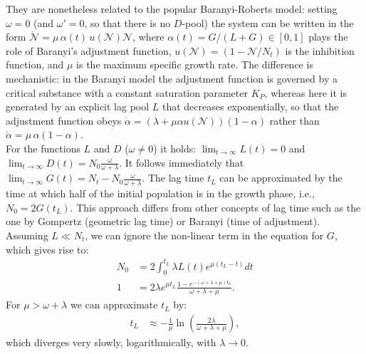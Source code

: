 \documentclass[10pt,1p,authoryear]{elsarticle}
\numberwithin{equation}{section}
\begin{document}
They are nonetheless related to the popular Baranyi-Roberts model: setting $\omega=0$ (and $\omega'=0$, so that there is no $D$-pool) the system can be written in the form $\dot{\mathcal{N}}=\mu\,\alpha(t)\,u(\mathcal{N})\mathcal{N}$, where $\alpha(t)=G/(L+G)\in[0,1]$ plays the role of Baranyi's adjustment function, $u(\mathcal{N})=(1-\mathcal{N}/N_t)$ is the inhibition function, and $\mu$ is the maximum specific growth rate. The difference is mechanistic: in the Baranyi model the adjustment function is governed by a critical substance with a constant saturation parameter $K_P$, whereas here it is generated by an explicit lag pool $L$ that decreases exponentially, so that the adjustment function obeys $\dot{\alpha}=(\lambda+\mu\alpha u(\mathcal{N}))(1-\alpha)$ rather than $\dot{\alpha}=\mu\,\alpha(1-\alpha)$.\\
%
For the functions $L$ and $D$ ($\omega \neq 0$) it holds: $\lim_{t\to\infty} L(t) = 0$ and  $\lim_{t\to\infty} D(t) =  N_0\frac{\omega}{\omega+\lambda} $.
It follows immediately that $\lim_{t\to\infty} G(t) = N_t-N_0\frac{\omega}{\omega+\lambda}$.
The lag time $t_L$ can be approximated by the time at which half of the initial population is in the growth phase, i.e., $N_0=2G(t_L)$.
This approach differs from other concepts of lag time such as the one by Gompertz (geometric lag time) or Baranyi (time of adjustment).\\
%
Assuming $L\ll N_t$, we can ignore the non-linear term in the equation for $G$, which gives rise to:
\begin{align}
    N_0&= 2\int_0^{t_L} \lambda L(t)e^{\mu(t_L-t)}dt\\
    1  &= 2\lambda e^{\mu t_L}\frac{1-e^{-(\omega+\lambda+\mu)t_L}}{\omega+\lambda+\mu}.
\end{align}
For $\mu > \omega+\lambda$  we can approximate $t_L$ by:
\begin{align}
    t_L &\approx -\frac{1}{\mu}\ln\left(\frac{2\lambda}{\omega+\lambda+\mu}\right),
\end{align}
which diverges very slowly, logarithmically, with $\lambda\to 0$.
%
%
\end{document}
